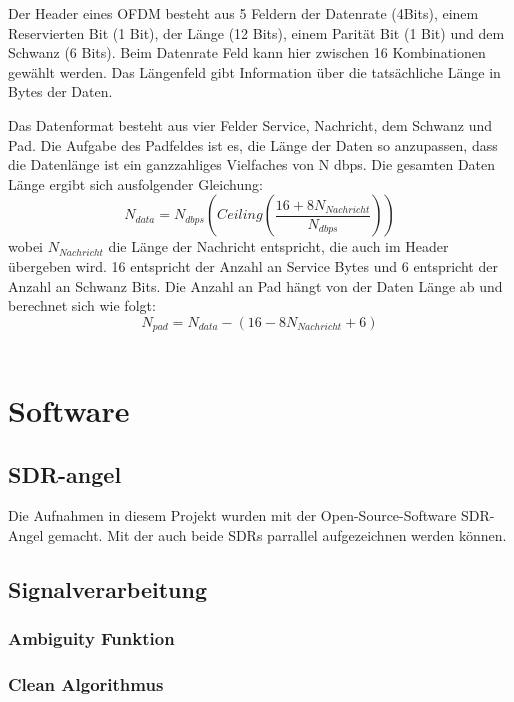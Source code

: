 Der Header eines OFDM besteht aus 5 Feldern der Datenrate (4Bits), einem Reservierten Bit (1 Bit), der Länge (12 Bits), einem Parität Bit (1 Bit) und dem Schwanz (6 Bits). Beim Datenrate Feld kann hier zwischen 16 Kombinationen gewählt werden. Das Längenfeld gibt Information über die tatsächliche Länge in Bytes der Daten.

Das Datenformat besteht aus vier Felder Service, Nachricht, dem Schwanz und Pad. Die Aufgabe des Padfeldes ist es, die Länge der Daten so anzupassen, dass die Datenlänge ist ein ganzzahliges Vielfaches von N dbps. Die gesamten Daten Länge ergibt sich ausfolgender Gleichung: $$N_{data}=N_{dbps}(Ceiling(\frac{16+8N_{Nachricht}}{N_{dbps}}))$$
wobei $N_{Nachricht}$ die Länge der Nachricht entspricht, die auch im Header übergeben wird. 16 entspricht der Anzahl an Service Bytes und 6 entspricht der Anzahl an Schwanz Bits. Die Anzahl an Pad hängt von der Daten Länge ab und berechnet sich wie folgt: $$N_{pad}=N_{data}-(16-8N_{Nachricht}+6)$$ ~\cite[S.49ff]{Liu2019}

\section{Software}
\subsection{SDR-angel}
Die Aufnahmen in diesem Projekt wurden mit der Open-Source-Software SDR-Angel gemacht. Mit der auch beide SDRs parrallel aufgezeichnen werden können.
\subsection{Signalverarbeitung}
\subsubsection{Ambiguity Funktion}\label{sct:ambiguity_function}
\subsubsection{Clean Algorithmus}
